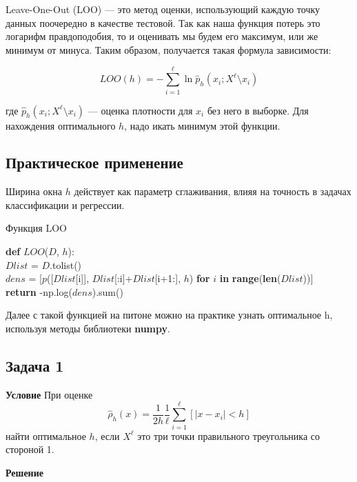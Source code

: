 Leave-One-Out (LOO) — это метод оценки, использующий каждую точку данных поочередно в качестве тестовой. Так как наша функция потерь это логарифм правдоподобия, то и оценивать мы будем его максимум, или же минимум от минуса. Таким образом, получается такая формула зависимости:

\[
    LOO(h) = -\sum_{i=1}^{\ell} \ln \hat{p}_h(x_i; X^\ell \setminus x_i)
\]

где $\hat{p}_h(x_i; X^\ell \setminus x_i)$ — оценка плотности для $x_i$ без него в выборке. Для нахождения оптимального $h$, надо икать минимум этой функции.

\subsection*{Практическое применение}

Ширина окна $h$ действует как параметр сглаживания, влияя на точность в задачах классификации и регрессии.

\begin{algorithm}[H]
    \caption{Функция LOO}
    \label{alg:LOO}
    \textbf{def} $LOO$($D$, $h$):\\

    \hspace{1cm} $Dlist$ = $D$.tolist()\\

    \hspace{1cm} $dens$ = [$p$([$Dlist$[i]], $Dlist$[:i]+$Dlist$[i+1:], $h$) \textbf{for} $i$ \textbf{in} \textbf{range}(\textbf{len}($Dlist$))]\\

    \hspace{1cm} \textbf{return} -np.log($dens$).sum() \\

\end{algorithm}

Далее с такой функцией на питоне можно на практике узнать оптимальное h, используя методы библиотеки \textbf{numpy}.

\subsection*{Задача 1}
\textbf{Условие}
При оценке
\[
    \hat{\rho}_h(x) = \frac{1}{2h} \frac{1}{\ell} \sum_{i=1}^{\ell} \left[ |x - x_i| < h \right]
\]
найти оптимальное $h$, если $X^\ell$ это три точки правильного треугольника со стороной 1.

\textbf{Решение}

